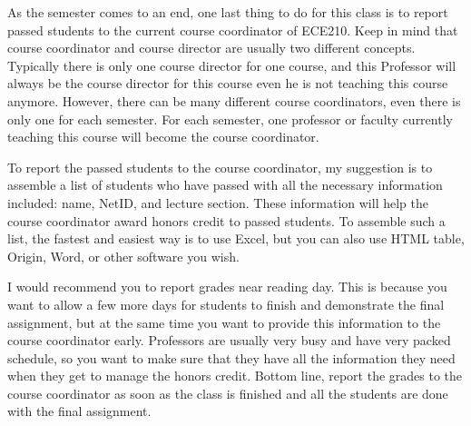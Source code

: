 As the semester comes to an end, one last thing to do for this class is to report passed students to the current course coordinator of ECE210. Keep in mind that course coordinator and course director are usually two different concepts. Typically there is only one course director for one course, and this Professor will always be the course director for this course even he is not teaching this course anymore. However, there can be many different course coordinators, even there is only one for each semester. For each semester, one professor or faculty currently teaching this course will become the course coordinator.

To report the passed students to the course coordinator, my suggestion is to assemble a list of students who have passed with all the necessary information included: name, NetID, and lecture section. These information will help the course coordinator award honors credit to passed students. To assemble such a list, the fastest and easiest way is to use Excel, but you can also use HTML table, Origin, Word, or other software you wish.

I would recommend you to report grades near reading day. This is because you want to allow a few more days for students to finish and demonstrate the final assignment, but at the same time you want to provide this information to the course coordinator early. Professors are usually very busy and have very packed schedule, so you want to make sure that they have all the information they need when they get to manage the honors credit. Bottom line, report the grades to the course coordinator as soon as the class is finished and all the students are done with the final assignment.
